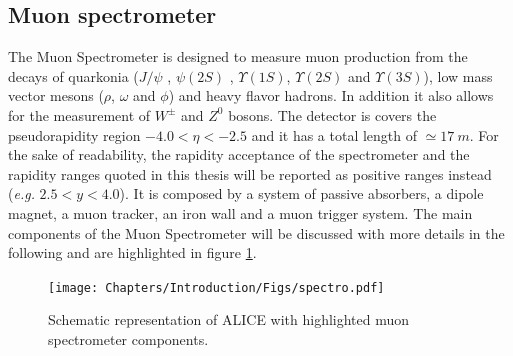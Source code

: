 \subsection{Muon spectrometer}
\label{ALICE_spectrometer}
The Muon Spectrometer is designed to measure muon production from the decays of quarkonia ($J/\psi$ , $\psi(2S)$ , $\Upsilon(1S)$, $\Upsilon(2S)$ and $\Upsilon(3S)$), low mass vector mesons ($\rho$, $\omega$ and $\phi$) and heavy flavor hadrons.
In addition it also allows for the measurement of $W^\pm$ and $Z^0$ bosons. 
The detector is covers the pseudorapidity region $-4.0 < \eta < -2.5$ and it has a total length of $\simeq 17\ m$.
For the sake of readability, the rapidity acceptance of the spectrometer and the rapidity ranges quoted in this thesis will be reported as positive ranges instead (\textit{e.g.} $2.5 < y < 4.0$).
It is composed by a system of passive absorbers, a dipole magnet, a muon tracker, an iron wall and a muon trigger system. 
The main components of the Muon Spectrometer will be discussed with more details in the following and are highlighted in figure \ref{fig:spectro}.

\begin{figure}[!h]
\begin{center}
\texttt{[image: Chapters/Introduction/Figs/spectro.pdf]}
\caption{Schematic representation of ALICE with highlighted muon spectrometer components.}
\label{fig:spectro}
\end{center}
\end{figure}

